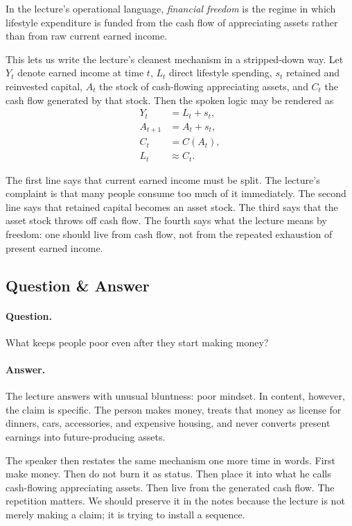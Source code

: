 \begin{definition}
In the lecture's operational language, \emph{financial freedom} is the regime in which lifestyle expenditure is funded from the cash flow of appreciating assets rather than from raw current earned income.
\end{definition}

This lets us write the lecture's cleanest mechanism in a stripped-down way. Let \(Y_t\) denote earned income at time \(t\), \(L_t\) direct lifestyle spending, \(s_t\) retained and reinvested capital, \(A_t\) the stock of cash-flowing appreciating assets, and \(C_t\) the cash flow generated by that stock. Then the spoken logic may be rendered as
\begin{align}
Y_t &= L_t + s_t,\\
A_{t+1} &= A_t + s_t,\\
C_t &= C(A_t),\\
L_t &\approx C_t.
\end{align}

The first line says that current earned income must be split. The lecture's complaint is that many people consume too much of it immediately. The second line says that retained capital becomes an asset stock. The third says that the asset stock throws off cash flow. The fourth says what the lecture means by freedom: one should live from cash flow, not from the repeated exhaustion of present earned income.

\subsection{Question \& Answer}

\paragraph{Question.} What keeps people poor even after they start making money?

\paragraph{Answer.} The lecture answers with unusual bluntness: poor mindset. In content, however, the claim is specific. The person makes money, treats that money as license for dinners, cars, accessories, and expensive housing, and never converts present earnings into future-producing assets.

The speaker then restates the same mechanism one more time in words. First make money. Then do not burn it as status. Then place it into what he calls cash-flowing appreciating assets. Then live from the generated cash flow. The repetition matters. We should preserve it in the notes because the lecture is not merely making a claim; it is trying to install a sequence.

